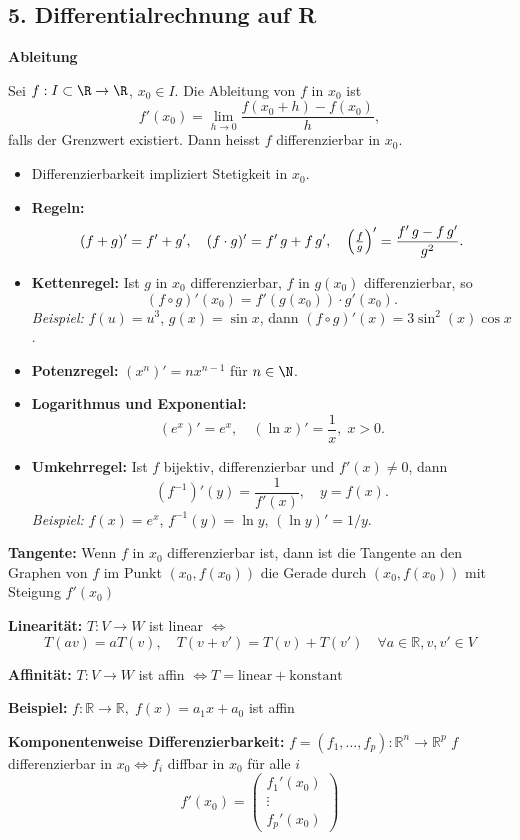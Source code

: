\begin{itemize}
\subsection{5. Differentialrechnung auf R}
\textbf{Ableitung}
\begin{definition}
  Sei $f:I\subset\R\to\R$, $x_0\in I$. Die Ableitung von $f$ in $x_0$ ist
  \[
    f'(x_0) = \lim_{h\to0} \frac{f(x_0 + h) - f(x_0)}{h},
  \]
  falls der Grenzwert existiert. Dann heisst $f$ differenzierbar in $x_0$.
\end{definition}
\begin{itemize}
  \item Differenzierbarkeit impliziert Stetigkeit in $x_0$.
  \item \textbf{Regeln:}
    \[
      (f+g)' = f' + g', \quad 
      (f\cdot g)' = f'\,g + f\,g', \quad
      \Bigl(\tfrac{f}{g}\Bigr)' = \frac{f'\,g - f\,g'}{g^2}.
    \]
  \item \textbf{Kettenregel:} Ist $g$ in $x_0$ differenzierbar, $f$ in $g(x_0)$ differenzierbar, so
    \[
      (f\circ g)'(x_0) = f'(g(x_0)) \cdot g'(x_0).
    \]
    \emph{Beispiel:} $f(u)=u^3$, $g(x)=\sin x$, dann $(f\circ g)'(x)=3\sin^2(x)\cos x$.
  \item \textbf{Potenzregel:} $(x^n)' = n x^{n-1}$ für $n\in\N$.
  \item \textbf{Logarithmus und Exponential:}  
    \[
      (e^x)' = e^x,\quad (\ln x)' = \frac{1}{x},\; x>0.
    \]
  \item \textbf{Umkehrregel:} Ist $f$ bijektiv, differenzierbar und $f'(x)\ne0$, dann
    \[
      (f^{-1})'(y) = \frac{1}{f'(x)},\quad y = f(x).
    \]
    \emph{Beispiel:} $f(x)=e^x$, $f^{-1}(y)=\ln y$, $(\ln y)' = 1/y$.
\end{itemize}

\textbf{Tangente:}  
Wenn \(f\) in \(x_0\) differenzierbar ist, dann ist die Tangente an den Graphen von \(f\) im Punkt \((x_0, f(x_0))\)  
die Gerade durch \((x_0, f(x_0))\) mit Steigung \(f'(x_0)\)

\textbf{Linearität:}  
\(T: V \to W\) ist linear \(\Leftrightarrow\)  
\[
T(av) = aT(v), \quad T(v + v') = T(v) + T(v')\quad \forall a \in \mathbb{R}, v, v' \in V
\]

\textbf{Affinität:}  
\(T: V \to W\) ist affin \(\Leftrightarrow T = \text{linear} + \text{konstant}\)

\textbf{Beispiel:} \(f: \mathbb{R} \to \mathbb{R},\; f(x) = a_1 x + a_0\) ist affin

\textbf{Komponentenweise Differenzierbarkeit:}  
\(f = (f_1, \dots, f_p): \mathbb{R}^n \to \mathbb{R}^p\)  
\(f\) differenzierbar in \(x_0 \Leftrightarrow f_i\) diffbar in \(x_0\) für alle \(i\)  
\[
f'(x_0) = \begin{pmatrix} f_1'(x_0) \\ \vdots \\ f_p'(x_0) \end{pmatrix}
\]


\end{itemize}
